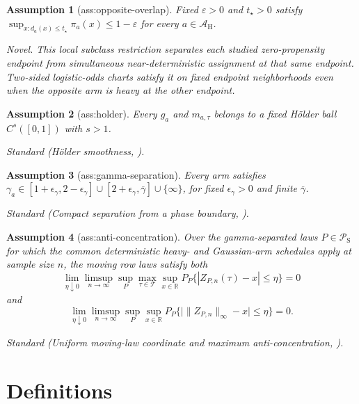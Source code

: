\documentclass{article}
\newtheorem{assumption}{Assumption}
\begin{document}
\begin{assumption}[ass:opposite-overlap]\label{ass:opposite-overlap}
Fixed \(\varepsilon>0\) and \(t_\star>0\) satisfy \(\sup_{x:d_a(x)\le t_\star}\pi_a(x)\le1-\varepsilon\) for every \(a\in\mathcal A_{\mathrm H}\).
\par\smallskip\noindent\emph{Novel.} This local subclass restriction separates each studied zero-propensity endpoint from simultaneous near-deterministic assignment at that same endpoint. Two-sided logistic-odds charts satisfy it on fixed endpoint neighborhoods even when the opposite arm is heavy at the other endpoint.
\end{assumption}

\begin{assumption}[ass:holder]\label{ass:holder}
Every \(g_a\) and \(m_{a,\tau}\) belongs to a fixed Hölder ball \(C^s([0,1])\) with \(s>1\).
\par\smallskip\noindent\emph{Standard} (Hölder smoothness, \cite{Dorn2025}).
\end{assumption}

\begin{assumption}[ass:gamma-separation]\label{ass:gamma-separation}
Every arm satisfies \(\gamma_a\in[1+\epsilon_\gamma,2-\epsilon_\gamma]\cup[2+\epsilon_\gamma,\overline\gamma]\cup\{\infty\}\), for fixed \(\epsilon_\gamma>0\) and finite \(\overline\gamma\).
\par\smallskip\noindent\emph{Standard} (Compact separation from a phase boundary, \cite{HeilerKazak2021}).
\end{assumption}

\begin{assumption}[ass:anti-concentration]\label{ass:anti-concentration}
Over the gamma-separated laws \(P\in\mathcal P_{\mathrm S}\) for which the common deterministic heavy- and Gaussian-arm schedules apply at sample size \(n\), the moving row laws satisfy both
\[
\lim_{\eta\downarrow0}\limsup_{n\to\infty}\sup_P
\max_{\tau\in\mathcal T}\sup_{x\in\mathbb R}
P_P\{|Z_{P,n}(\tau)-x|\le\eta\}=0
\]
and
\[
\lim_{\eta\downarrow0}\limsup_{n\to\infty}\sup_P
\sup_{x\in\mathbb R}
P_P\{\bigl|\|Z_{P,n}\|_\infty-x\bigr|\le\eta\}=0.
\]
\par\smallskip\noindent\emph{Standard} (Uniform moving-law coordinate and maximum anti-concentration, \cite{PolitisRomanoWolf1999}).
\end{assumption}

\section{Definitions}
\end{document}
